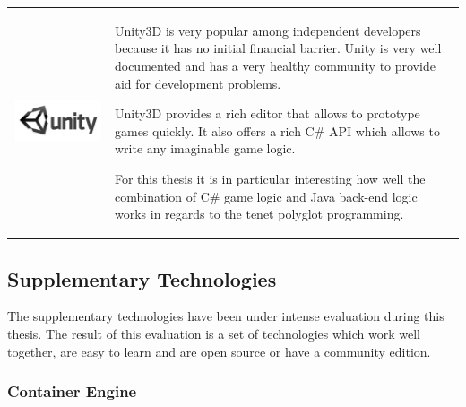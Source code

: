 \begin{table}[h!]
  \centering
  \begin{tabular}{ c m{9cm} }
    \begin{minipage}{.3\textwidth}
      \includegraphics[width=\linewidth]{images/dependencies/Unity3D}
    \end{minipage}&
    
    Unity3D is very popular among independent developers because it has no
    initial financial barrier. Unity is very well documented and has a very
    healthy community to provide aid for development problems.
    
    Unity3D provides a rich editor that allows to prototype games quickly. It
    also offers a rich C\# API which allows to write any imaginable game logic. 
    
    For this thesis it is in particular interesting how well the combination of
    C\# game logic and Java back-end logic works in regards to the \ms{} tenet
    polyglot programming.
    
  \end{tabular}
\end{table}
\FloatBarrier
\newpage

\subsection{Supplementary Technologies}

The supplementary technologies have been under intense evaluation during this
thesis. The result of this evaluation is a set of technologies which work well
together, are easy to learn and are open source or have a community edition.

\subsubsection{Container Engine}

